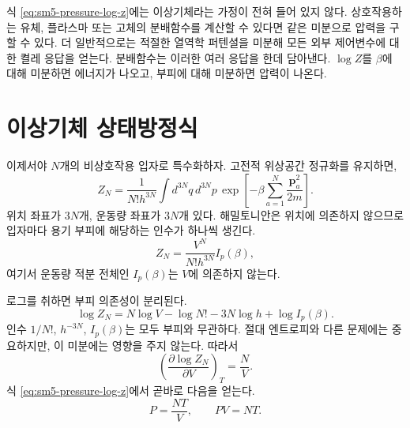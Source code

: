 식 \eqref{eq:sm5-pressure-log-z}에는 이상기체라는 가정이 전혀 들어 있지 않다. 상호작용하는 유체, 플라스마 또는 고체의 분배함수를 계산할 수 있다면 같은 미분으로 압력을 구할 수 있다. 더 일반적으로는 적절한 열역학 퍼텐셜을 미분해 모든 외부 제어변수에 대한 켤레 응답을 얻는다. 분배함수는 이러한 여러 응답을 한데 담아낸다. \(\log Z\)를 \(\beta\)에 대해 미분하면 에너지가 나오고, 부피에 대해 미분하면 압력이 나온다.

\section{이상기체 상태방정식}

이제서야 \(N\)개의 비상호작용 입자로 특수화하자. 고전적 위상공간 정규화를 유지하면,
\begin{equation}
 Z_N=
 \frac{1}{N!h^{3N}}
 \int d^{3N}q\,d^{3N}p\,
 \exp\!\left[
 -\beta\sum_{a=1}^{N}\frac{\mathbf p_a^2}{2m}
 \right].
 \label{eq:sm5-ideal-gas-partition-integral}
\end{equation}
위치 좌표가 \(3N\)개, 운동량 좌표가 \(3N\)개 있다. 해밀토니안은 위치에 의존하지 않으므로 입자마다 용기 부피에 해당하는 인수가 하나씩 생긴다.
\begin{equation}
 Z_N=
 \frac{V^N}{N!h^{3N}}I_p(\beta),
 \label{eq:sm5-ideal-gas-factorization}
\end{equation}
여기서 운동량 적분 전체인 \(I_p(\beta)\)는 \(V\)에 의존하지 않는다.

\begin{classroomqa}
\end{classroomqa}

로그를 취하면 부피 의존성이 분리된다.
\begin{equation}
 \log Z_N
 =
 N\log V-\log N!-3N\log h+\log I_p(\beta).
 \label{eq:sm5-log-ideal-gas-partition}
\end{equation}
인수 \(1/N!\), \(h^{-3N}\), \(I_p(\beta)\)는 모두 부피와 무관하다. 절대 엔트로피와 다른 문제에는 중요하지만, 이 미분에는 영향을 주지 않는다. 따라서
\begin{equation}
 \left(\frac{\partial\log Z_N}{\partial V}\right)_T
 =\frac{N}{V}.
 \label{eq:sm5-log-z-volume-derivative}
\end{equation}
식 \eqref{eq:sm5-pressure-log-z}에서 곧바로 다음을 얻는다.
\begin{equation}
 P=\frac{NT}{V},
 \qquad
 \boxed{PV=NT}.
 \label{eq:sm5-ideal-gas-law}
\end{equation}

